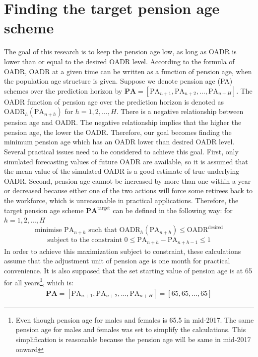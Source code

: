 \documentclass[11pt,a4paper,]{article}
\begin{document}
\hypertarget{sec:target}{%
\section{Finding the target pension age scheme}\label{sec:target}}

The goal of this research is to keep the pension age low, as long as OADR is lower than or equal to the desired OADR level. According to the formula of OADR, OADR at a given time can be written as a function of pension age, when the population age structure is given. Suppose we denote pension age (PA) schemes over the prediction horizon by \(\bm{\text{PA}}=[\text{PA}_{n+1}, \text{PA}_{n+2},\dots,\text{PA}_{n+H}]\). The OADR function of pension age over the prediction horizon is denoted as \(\text{OADR}_h(\text{PA}_{n+h})\) for \(h=1,2,\dots,H\). There is a negative relationship between pension age and OADR. The negative relationship implies that the higher the pension age, the lower the OADR. Therefore, our goal becomes finding the minimum pension age which has an OADR lower than desired OADR level. Several practical issues need to be considered to achieve this goal. First, only simulated forecasting values of future OADR are available, so it is assumed that the mean value of the simulated OADR is a good estimate of true underlying OADR. Second, pension age cannot be increased by more than one within a year or decreased because either one of the two actions will force some retirees back to the workforce, which is unreasonable in practical applications. Therefore, the target pension age scheme \(\bm{\text{PA}}^{\text{target}}\) can be defined in the following way:
for \(h=1,2,\dots,H\)
\[
  \text{minimise~} \text{PA}_{n+h}  \text{~such that~} \text{OADR}_h(\text{PA}_{n+h})\leq \text{OADR}^{\text{desired}}
\]
\begin{align*}
  \text{subject to the constraint~} 0\leq \text{PA}_{n+h}-\text{PA}_{n+h-1}\leq 1
\end{align*}
In order to achieve this maximization subject to constraint, these calculations assume that the adjustment unit of pension age is one month for practical convenience. It is also supposed that the set starting value of pension age is at 65 for all years\footnote{Even though pension age for males and females is 65.5 in mid-2017. The same pension age for males and females was set to simplify the calculations. This simplification is reasonable because the pension age will be same in mid-2017 onward}, which is:
\begin{align*}
  \bm{\text{PA}}=\left[\text{PA}_{n+1},\text{PA}_{n+2},\dots,\text{PA}_{n+H}\right] = \left[65,65,\dots,65\right]
\end{align*}
\end{document}
